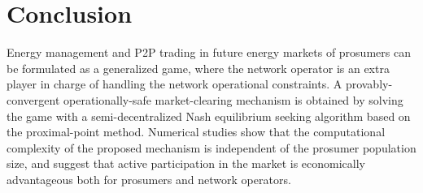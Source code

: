 \documentclass{IEEEtran}  %
\newcommand{\0}{\mathbf{0}}
\newcommand{\1}{\mathbf{1}}
\newcommand{\edit}[1]{\color{blue}{#1}\color{black}}
\begin{document}

\section{Conclusion}
Energy management and P2P trading in future energy markets of prosumers can be formulated as a generalized game, where the network operator is an extra player in charge of handling the network operational constraints. A provably-convergent operationally-safe market-clearing mechanism is obtained by solving the game with a semi-decentralized Nash equilibrium seeking algorithm based on the proximal-point method.    
%
Numerical studies show that the computational complexity of the proposed mechanism is independent of the prosumer population size, and suggest that active participation in the market is economically advantageous both for prosumers and network operators.
\end{document}
